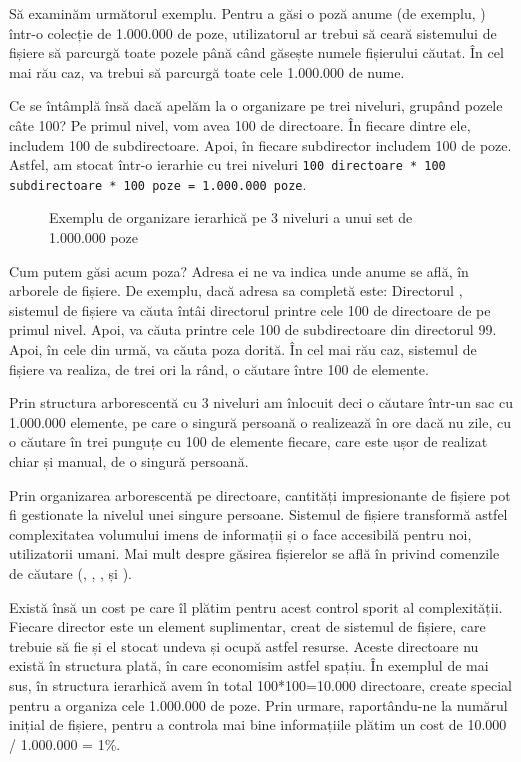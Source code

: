 Să examinăm următorul exemplu. Pentru a găsi o poză anume (de exemplu,
) într-o colecție de 1.000.000 de poze, utilizatorul
ar trebui să ceară sistemului de fișiere să parcurgă toate pozele până când
găsește numele fișierului căutat. În cel mai rău caz, va trebui să parcurgă
toate cele 1.000.000 de nume.

Ce se întâmplă însă dacă apelăm la o organizare pe trei niveluri, grupând pozele
câte 100? Pe primul nivel, vom avea 100 de directoare. În fiecare dintre ele,
includem 100 de subdirectoare. Apoi, în fiecare subdirector includem 100 de
poze. Astfel, am stocat într-o ierarhie cu trei niveluri \texttt{100 directoare * 100 subdirectoare * 100 poze = 1.000.000 poze}.

\begin{figure}[htbp]
	\centering
	\def\svgwidth{\columnwidth}
	
	\caption{Exemplu de organizare ierarhică pe 3 niveluri a unui set de 1.000.000 poze}
	\label{fig:ex-3-lvl}
\end{figure}

Cum putem găsi acum poza? Adresa ei ne va indica unde anume se află, în arborele
de fișiere. De exemplu, dacă adresa sa completă este: Directorul
, sistemul de fișiere va căuta
întâi directorul  printre cele 100 de directoare de pe primul nivel. Apoi, va
căuta  printre cele 100 de subdirectoare din directorul 99.
Apoi, în cele din urmă, va căuta poza dorită. În cel mai rău caz, sistemul de
fișiere va realiza, de trei ori la rând, o căutare între 100 de elemente.

Prin structura arborescentă cu 3 niveluri am înlocuit deci o căutare într-un sac
cu 1.000.000 elemente, pe care o singură persoană o realizează în ore dacă nu
zile, cu o căutare în trei punguțe cu 100 de elemente fiecare, care este ușor de
realizat chiar și manual, de o singură persoană.

Prin organizarea arborescentă pe directoare, cantități impresionante de fișiere
pot fi gestionate la nivelul unei singure persoane. Sistemul de fișiere
transformă astfel complexitatea volumului imens de informații și o face
accesibilă pentru noi, utilizatorii umani. Mai mult despre găsirea fișierelor
se află în  privind
comenzile de căutare (, , ,  și
).

Există însă un cost pe care îl plătim pentru acest control sporit al
complexității. Fiecare director este un element suplimentar, creat de sistemul
de fișiere, care trebuie să fie și el stocat undeva și ocupă astfel resurse.
Aceste directoare nu există în structura plată, în care economisim astfel
spațiu. În exemplul de mai sus, în structura ierarhică avem în total
100*100=10.000 directoare, create special pentru a organiza cele 1.000.000 de
poze. Prin urmare, raportându-ne la numărul inițial de fișiere, pentru a
controla mai bine informațiile plătim un cost de 10.000 / 1.000.000 = 1\%.

